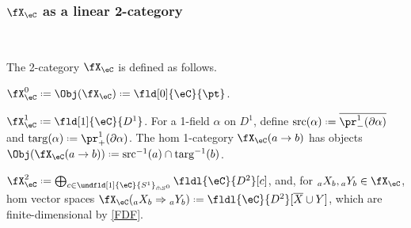 \documentclass[12pt,reqno]{amsart}
\newcounter{alpha}\renewcommand\thealpha{\upshape\Alph{alpha}}
\newcommand{\src}{\mathrm{src}}
\newcommand{\targ}{\mathrm{targ}}
\newcommand{\C}{\eC}
\newcommand{\bdy}{\partial}
\newcommand{\fcj}[1]{\overline{#1}}
\DeclareRobustCommand{\coloneq}{\mathrel{\vcenter{\baselineskip0.5ex\lineskiplimit0pt\hbox{\scriptsize{\upshape.}}\hbox{\scriptsize{\upshape.}}}}=}
\begin{document}
\subsubsection{\texorpdfstring{$\fX_\C$}{X(C)} as a linear 2-category}

\

\label{sec:skein 2-category}
\begin{construction}
    \label{construction:skein 2-category}
    The 2-category $\fX_\C$ is defined as follows.
    \begin{lst}[widestlabel]
        \item
        $\fX^0_\C\coloneq\Obj(\fX_\C)\coloneq\fld[0]{\C}{\pt}$.

        \item
        $\fX^1_\C\coloneq\fld[1]{\C}{D^1}$. For a 1-field $\alpha$ on $D^1$, define $\src(\alpha)\coloneq\fcj{\pr^1_-(\partial\alpha)}$ and $\targ(\alpha)\coloneq\pr^1_+(\bdy\alpha)$. The hom 1-category $\fX_\C(a \to b)$ has objects $\Obj(\fX_{\C}(a \to b))\coloneq\src^{-1}(a) \cap \targ^{-1}(b)$.

        \item
        $\fX_\C^2\coloneq\bigoplus_{c\in\undfld[1]{\C}{S^1}_{\pitchfork S^0}}\fldl{\C}{D^2}[c]$, and, for ${}_aX_b,{}_aY_b\in\fX_\C$, hom vector spaces $\fX_{\C}({}_aX_b \Rightarrow {}_aY_b) \coloneq \fldl{\C}{D^2}[\fcj{X}\cup Y]$, which are finite-dimensional by \ref{FDF}.


\end{lst}
\end{construction}
\end{document}
